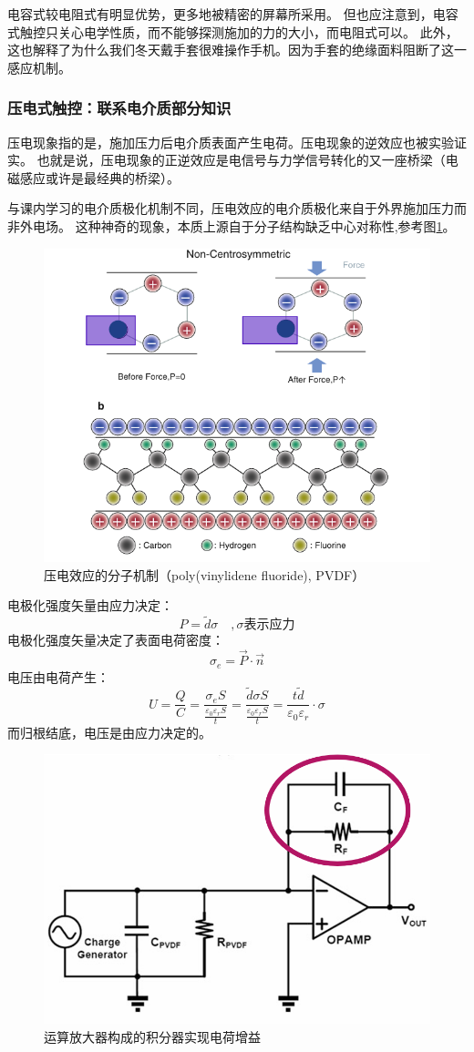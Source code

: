 \documentclass[UTF-8]{ctexart}
\begin{document}
电容式较电阻式有明显优势，更多地被精密的屏幕所采用。
但也应注意到，电容式触控只关心电学性质，而不能够探测施加的力的大小，而电阻式可以。
此外，这也解释了为什么我们冬天戴手套很难操作手机。因为手套的绝缘面料阻断了这一感应机制。
\subsubsection{压电式触控：联系电介质部分知识}
压电现象指的是，施加压力后电介质表面产生电荷。压电现象的逆效应也被实验证实。
也就是说，压电现象的正逆效应是电信号与力学信号转化的又一座桥梁（电磁感应或许是最经典的桥梁）。

与课内学习的电介质极化机制不同，压电效应的电介质极化来自于外界施加压力而非外电场。
这种神奇的现象，本质上源自于分子结构缺乏中心对称性,参考图\ref{压电效应的分子机制 }。
\begin{figure}
    \centering
    \includegraphics[width=0.7\linewidth]{../Figures/piezoelectric.png}
    \caption{压电效应的分子机制（poly(vinylidene fluoride), PVDF）\cite{Touch}}
    \label{压电效应的分子机制 }
\end{figure}
电极化强度矢量由应力决定：
$$
P=\tilde{d}\sigma\quad,\sigma\text{表示应力}
$$
电极化强度矢量决定了表面电荷密度：
$$
\sigma_{e}=\vec{P}\cdot \vec{n}
$$
电压由电荷产生：
$$
U=\frac{Q}{C}=\frac{\sigma_{e}S}{\frac{\varepsilon _0 \varepsilon _r S}{t}}=\frac{\tilde{d}\sigma S}{\frac{\varepsilon _0 \varepsilon _r S}{t}}=\frac{t\tilde{d} }{\varepsilon _0 \varepsilon _r}\cdot{\sigma}
$$
而归根结底，电压是由应力决定的。
\begin{figure}
    \centering
    \includegraphics[width=0.6\linewidth]{../Figures/opamp.png}
    \caption{运算放大器构成的积分器实现电荷增益\cite{Touch}}
    \label{运放}
\end{figure}
\end{document}

